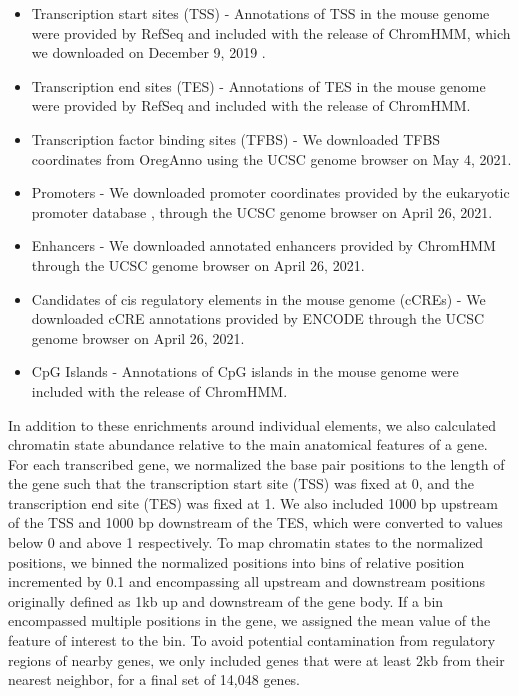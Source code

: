 \documentclass[
  11pt,
]{article}
\providecommand{\tightlist}{%
  \setlength{\itemsep}{0pt}\setlength{\parskip}{0pt}}
\begin{document}
\begin{itemize}
\tightlist
\item
  Transcription start sites (TSS) - Annotations of TSS in the mouse
  genome were provided by RefSeq \citep{pmid26553804} and included with
  the release of ChromHMM, which we downloaded on December 9, 2019
  \citep{pmid29120462}.
\item
  Transcription end sites (TES) - Annotations of TES in the mouse genome
  were provided by RefSeq and included with the release of ChromHMM.
\item
  Transcription factor binding sites (TFBS) - We downloaded TFBS
  coordinates from OregAnno \citep{pmid26578589} using the UCSC genome
  browser \citep{pmid12045153} on May 4, 2021.
\item
  Promoters - We downloaded promoter coordinates provided by the
  eukaryotic promoter database \citep{pmid27899657}, through the UCSC
  genome browser on April 26, 2021.
\item
  Enhancers - We downloaded annotated enhancers provided by ChromHMM
  through the UCSC genome browser on April 26, 2021.
\item
  Candidates of cis regulatory elements in the mouse genome (cCREs) - We
  downloaded cCRE annotations provided by ENCODE
  \citep{pmid22955616, pmid32728249} through the UCSC genome browser on
  April 26, 2021.
\item
  CpG Islands - Annotations of CpG islands in the mouse genome were
  included with the release of ChromHMM.
\end{itemize}

In addition to these enrichments around individual elements, we also
calculated chromatin state abundance relative to the main anatomical
features of a gene. For each transcribed gene, we normalized the base
pair positions to the length of the gene such that the transcription
start site (TSS) was fixed at 0, and the transcription end site (TES)
was fixed at 1. We also included 1000 bp upstream of the TSS and 1000 bp
downstream of the TES, which were converted to values below 0 and above
1 respectively. To map chromatin states to the normalized positions, we
binned the normalized positions into bins of relative position
incremented by 0.1 and encompassing all upstream and downstream
positions originally defined as 1kb up and downstream of the gene body.
If a bin encompassed multiple positions in the gene, we assigned the
mean value of the feature of interest to the bin. To avoid potential
contamination from regulatory regions of nearby genes, we only included
genes that were at least 2kb from their nearest neighbor, for a final
set of 14,048 genes.
\end{document}
